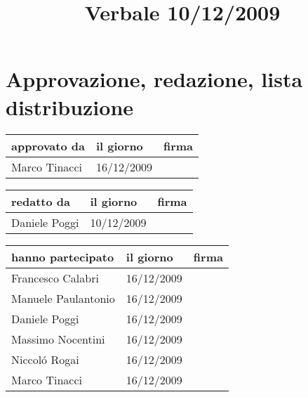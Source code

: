 \documentclass[a4paper, 12pt]{report}
\title{Verbale 10/12/2009}
\date{10/12/2009 \\Firenze \\\begin{figure}[h] \centering
\texttt{[image: ../../../../images/logokiwi.png]} \end{figure} }
\begin{document}
\maketitle

\newpage

\section*{Approvazione, redazione, lista distribuzione}
\begin{table}[h!]
  \begin{center}
    \begin{tabular}{| l | l | p{60mm} |}
    \hline
    \textbf{approvato da} & \textbf{il giorno} & \textbf{firma} \\
	\hline    
	Marco Tinacci & 16/12/2009 &  \\
    \hline
    \end{tabular}
  \end{center}
\end{table}

\begin{table}[h!]
  \begin{center}
    \begin{tabular}{| l | l | p{60mm} |}
    \hline
    \textbf{redatto da} & \textbf{il giorno} & \textbf{firma} \\
	\hline    
	Daniele Poggi & 10/12/2009 &  \\
    \hline
    \end{tabular}
  \end{center}
\end{table}

\begin{table}[h!]
  \begin{center}
    \begin{tabular}{| l | l | p{60mm} |}
    \hline
    \textbf{hanno partecipato} & \textbf{il giorno} & \textbf{firma} \\
	\hline    
	Francesco Calabri & 16/12/2009 &  \\
    \hline
	Manuele Paulantonio & 16/12/2009 &  \\
    \hline
	Daniele Poggi & 16/12/2009 &  \\
    \hline
	Massimo Nocentini & 16/12/2009 &  \\
    \hline
	Niccol\'o Rogai & 16/12/2009 &  \\
    \hline
	Marco Tinacci & 16/12/2009 &  \\
    \hline
    \end{tabular}
  \end{center}
\end{table}

\newpage 


\end{document}
